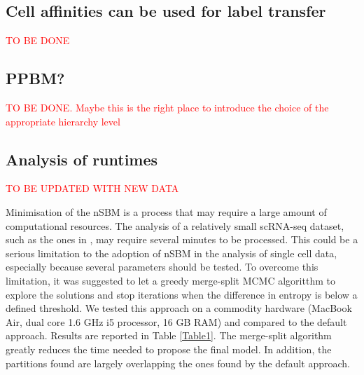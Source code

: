 \documentclass[10pt]{article}
\begin{document}
\subsection*{Cell affinities can be used for label transfer}

\textcolor{red}{TO BE DONE}

\subsection*{PPBM?}

\textcolor{red}{TO BE DONE. Maybe this is the right place to introduce the choice of the appropriate hierarchy level}


\subsection*{Analysis of runtimes}

\textcolor{red}{TO BE UPDATED WITH NEW DATA}

Minimisation of the nSBM is a process that may require a large amount of computational resources. The analysis of a relatively small scRNA-seq dataset, such as the ones in \cite{mereu_2020}, may require several minutes to be processed. This could be a serious limitation to the adoption of nSBM in the analysis of single cell data, especially because several parameters should be tested. To overcome this limitation, it was suggested to let a greedy merge-split MCMC algoritthm \cite{peixoto_2020} to explore the solutions and stop iterations when the difference in entropy is below a defined threshold. We tested this approach on a commodity hardware (MacBook Air, dual core 1.6 GHz i5 processor, 16 GB RAM) and compared to the default approach. Results are reported in Table \ref{Table1}. The merge-split algorithm greatly reduces the time needed to propose the final model. In addition, the partitions found are largely overlapping the ones found by the default approach. 
\end{document}
